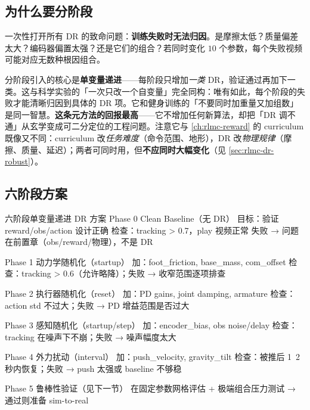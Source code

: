\subsection{为什么要分阶段}
\label{sec:rlmc-dr-phased-why}

一次性打开所有 DR 的致命问题：\textbf{训练失败时无法归因}。是摩擦太低？质量偏差太大？编码器偏置太强？还是它们的组合？若同时变化 $10$ 个参数，每个失败视频可能对应无数种根因组合。

\begin{insight}\label{ins:rlmc-dr-phased}
分阶段引入的核心是\textbf{单变量递进}——每阶段只增加\emph{一类} DR，验证通过再加下一类。这与科学实验的「一次只改一个自变量」完全同构：唯有如此，每个阶段的失败才能清晰归因到具体的 DR 项。它和健身训练的「不要同时加重量又加组数」是同一智慧。\textbf{这条元方法的回报最高}——它不增加任何新算法，却把「DR 调不通」从玄学变成可二分定位的工程问题。注意它与 \cref{ch:rlmc-reward} 的 curriculum 既像又不同：curriculum 改\emph{任务难度}（命令范围、地形），DR 改\emph{物理规律}（摩擦、质量、延迟）；两者可同时用，但\textbf{不应同时大幅变化}（见 \cref{sec:rlmc-dr-robust}）。
\end{insight}

\subsection{六阶段方案}
\label{sec:rlmc-dr-phased-six}

\begin{codebox}{六阶段单变量递进 DR 方案}
Phase 0  Clean Baseline（无 DR）
  目标：验证 reward/obs/action 设计正确
  检查：tracking > 0.7，play 视频正常
  失败 → 问题在前置章（obs/reward/物理），不是 DR

Phase 1  动力学随机化（startup）
  加：foot_friction, base_mass, com_offset
  检查：tracking > 0.6（允许略降）；失败 → 收窄范围逐项排查

Phase 2  执行器随机化（reset）
  加：PD gains, joint damping, armature
  检查：action std 不过大；失败 → PD 增益范围是否过大

Phase 3  感知随机化（startup/step）
  加：encoder_bias, obs noise/delay
  检查：tracking 在噪声下不崩；失败 → 噪声幅度太大

Phase 4  外力扰动（interval）
  加：push_velocity, gravity_tilt
  检查：被推后 1~2 秒内恢复；失败 → push 太强或 baseline 不够稳

Phase 5  鲁棒性验证（见下一节）
  在固定参数网格评估 + 极端组合压力测试 → 通过则准备 sim-to-real
\end{codebox}

